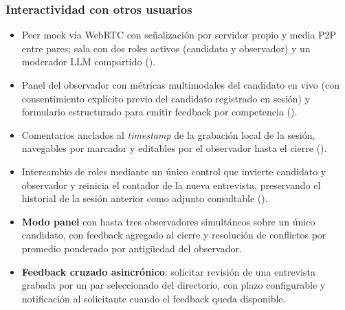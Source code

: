 \subsubsection{Interactividad con otros usuarios}
\begin{itemize}
  \item Peer mock vía WebRTC con señalización por servidor propio y
        media P2P entre pares; sala con dos roles activos
        (candidato y observador) y un moderador LLM compartido
        ().
  \item Panel del observador con métricas multimodales del candidato
        en vivo (con consentimiento explícito previo del candidato
        registrado en sesión) y formulario estructurado para emitir
        feedback por competencia ().
  \item Comentarios anclados al \textit{timestamp} de la grabación
        local de la sesión, navegables por marcador y editables por el
        observador hasta el cierre ().
  \item Intercambio de roles mediante un único control que invierte
        candidato y observador y reinicia el contador de la nueva
        entrevista, preservando el historial de la sesión anterior
        como adjunto consultable ().
  \item \textbf{Modo panel} con hasta tres observadores simultáneos
        sobre un único candidato, con feedback agregado al cierre y
        resolución de conflictos por promedio ponderado por
        antigüedad del observador.
  \item \textbf{Feedback cruzado asincrónico}: solicitar revisión de
        una entrevista grabada por un par seleccionado del directorio,
        con plazo configurable y notificación al solicitante cuando el
        feedback queda disponible.
\end{itemize}

